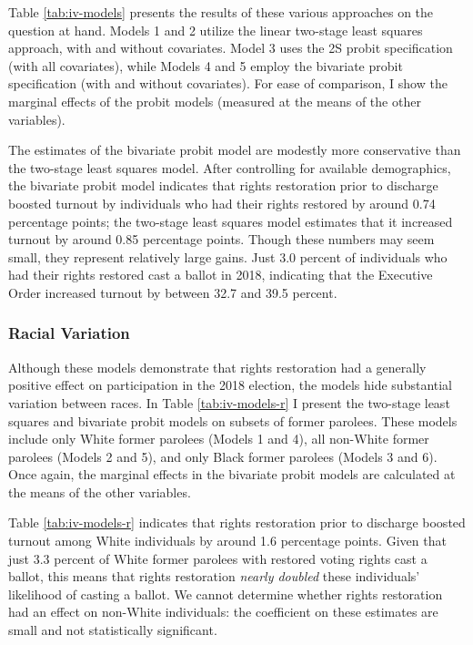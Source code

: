 \documentclass[12pt,]{article}
\begin{document}
Table \ref{tab:iv-models} presents the results of these various approaches on the question at hand. Models 1 and 2 utilize the linear two-stage least squares approach, with and without covariates. Model 3 uses the 2S probit specification (with all covariates), while Models 4 and 5 employ the bivariate probit specification (with and without covariates). For ease of comparison, I show the marginal effects of the probit models (measured at the means of the other variables).



The estimates of the bivariate probit model are modestly more conservative than the two-stage least squares model. After controlling for available demographics, the bivariate probit model indicates that rights restoration prior to discharge boosted turnout by individuals who had their rights restored by around 0.74 percentage points; the two-stage least squares model estimates that it increased turnout by around 0.85 percentage points. Though these numbers may seem small, they represent relatively large gains. Just 3.0 percent of individuals who had their rights restored cast a ballot in 2018, indicating that the Executive Order increased turnout by between 32.7 and 39.5 percent.

\hypertarget{racial-variation}{%
\subsubsection*{Racial Variation}\label{racial-variation}}

Although these models demonstrate that rights restoration had a generally positive effect on participation in the 2018 election, the models hide substantial variation between races. In Table \ref{tab:iv-models-r} I present the two-stage least squares and bivariate probit models on subsets of former parolees. These models include only White former parolees (Models 1 and 4), all non-White former parolees (Models 2 and 5), and only Black former parolees (Models 3 and 6). Once again, the marginal effects in the bivariate probit models are calculated at the means of the other variables.



Table \ref{tab:iv-models-r} indicates that rights restoration prior to discharge boosted turnout among White individuals by around 1.6 percentage points. Given that just 3.3 percent of White former parolees with restored voting rights cast a ballot, this means that rights restoration \emph{nearly doubled} these individuals' likelihood of casting a ballot. We cannot determine whether rights restoration had an effect on non-White individuals: the coefficient on these estimates are small and not statistically significant.
\end{document}
